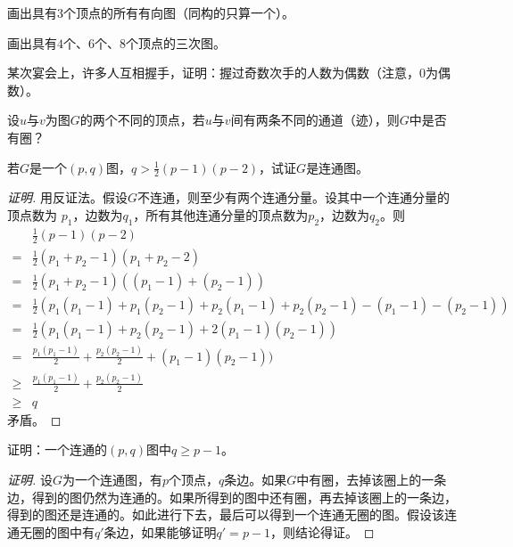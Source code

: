 \documentclass{article}
\begin{document}
\begin{CJK}{UTF8}{gbsn}
\begin{Exercise}
  画出具有$3$个顶点的所有有向图（同构的只算一个）。
\end{Exercise}
\begin{Exercise}
  画出具有$4$个、$6$个、$8$个顶点的三次图。
\end{Exercise}
\begin{Exercise}
  某次宴会上，许多人互相握手，证明：握过奇数次手的人数为偶数（注意，$0$为偶数）。
\end{Exercise}
\begin{Exercise}
  设$u$与$v$为图$G$的两个不同的顶点，若$u$与$v$间有两条不同的通道（迹），则$G$中是否有圈？
\end{Exercise}
  \begin{Exercise}
  若$G$是一个$(p,q)$图，$q > \frac{1}{2}(p-1)(p-2)$，试证$G$是连通图。  
  \end{Exercise}
  \begin{proof}[证明]
    用反证法。假设$G$不连通，则至少有两个连通分量。设其中一个连通分量的顶点数为
    $p_1$，边数为$q_1$，所有其他连通分量的顶点数为$p_2$，边数为$q_2$。则
    \begin{equation*}
      \begin{split}
        &\frac{1}{2}(p-1)(p-2)\\
        =&\frac{1}{2}(p_1 + p_2 -1)(p_1 + p_2 -2)\\
        =&\frac{1}{2}(p_1 + p_2 -1)((p_1 - 1) + (p_2 - 1))\\
        =&\frac{1}{2}(p_1(p_1 -1) +  p_1(p_2 - 1) + p_2(p_1 - 1) + p_2(p_2-1) - (p_1 - 1) - (p_2-1))\\
        =&\frac{1}{2}(p_1(p_1 -1) +   p_2(p_2-1) + 2(p_1 - 1)(p_2-1))\\
        =&\frac{p_1(p_1 -1)}{2} +   \frac{p_2(p_2-1)}{2} + (p_1 - 1)(p_2-1))\\
        \geq&\frac{p_1(p_1 -1)}{2} +   \frac{p_2(p_2-1)}{2}\\
        \geq & q
      \end{split}
    \end{equation*}
    矛盾。
  \end{proof}


  \begin{Exercise}
  证明：一个连通的$(p,q)$图中$q\geq p - 1$。  
  \end{Exercise}
  \begin{proof}[证明]
    设$G$为一个连通图，有$p$个顶点，$q$条边。如果$G$中有圈，去掉该圈上的一条边，得到的图仍然为连通的。如果所得到的图中还有圈，再去掉该圈上的一条边，得到的图还是连通的。如此进行下去，最后可以得到一个连通无圈的图。假设该连通无圈的图中有$q'$条边，如果能够证明$q'=p-1$，则结论得证。


\end{proof}
\end{CJK}
\end{document}
